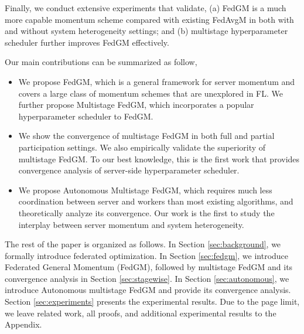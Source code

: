 Finally, we conduct extensive experiments that validate, (a) FedGM is a much more capable momentum scheme compared with existing FedAvgM in both with and without system heterogeneity settings; and (b) multistage hyperparameter scheduler further improves FedGM effectively.

Our main contributions can be summarized as follow,

\begin{itemize}[leftmargin=*]
    \item We propose FedGM, which is a general framework for server momentum and covers a large class of momentum schemes that are unexplored in FL. We further propose Multistage FedGM, which incorporates a popular hyperparameter scheduler to FedGM.
    \item We show the convergence of multistage FedGM in both full and partial participation settings. We also empirically validate the superiority of multistage FedGM. To our best knowledge, this is the first work that provides convergence analysis of server-side hyperparameter scheduler.
    \item We propose Autonomous Multistage FedGM, which requires much less coordination between server and workers than most existing algorithms, and theoretically analyze its convergence. Our work is the first to study the interplay between server momentum and system heterogeneity.
\end{itemize}

The rest of the paper is organized as follows. In Section \ref{sec:background}, we formally introduce federated optimization. In Section \ref{sec:fedgm}, we introduce Federated General Momentum (FedGM), followed by multistage FedGM and its convergence analysis in Section \ref{sec:stagewise}. In Section \ref{sec:autonomous}, we introduce Autonomous multistage FedGM and provide its convergence analysis. Section \ref{sec:experiments} presents the experimental results. Due to the page limit, we leave related work, all proofs, and additional experimental results to the Appendix.